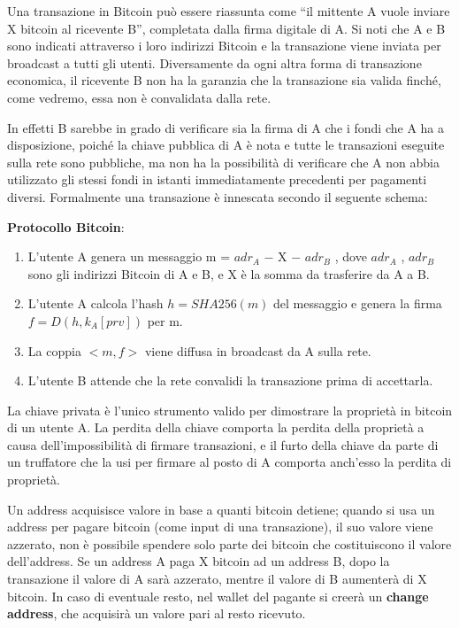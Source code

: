 Una transazione in Bitcoin può essere riassunta come “il mittente A vuole inviare X bitcoin al ricevente B”, completata dalla ﬁrma digitale di A. Si noti che A e B sono indicati attraverso i loro indirizzi Bitcoin e la transazione viene inviata per broadcast a tutti gli utenti. Diversamente da ogni altra forma di transazione economica, il ricevente B non ha la garanzia che la transazione sia valida ﬁnché, come vedremo, essa non è convalidata dalla rete. 

In effetti B sarebbe in grado di veriﬁcare sia la ﬁrma di A che i fondi che A ha a disposizione, poiché la chiave pubblica di A è nota e tutte le transazioni eseguite sulla rete sono pubbliche, ma non ha la possibilità di veriﬁcare che A non abbia utilizzato gli stessi fondi in istanti immediatamente precedenti per pagamenti diversi. Formalmente una transazione è innescata secondo il seguente schema:
\begin{center}
\textbf{Protocollo Bitcoin}:
\begin{enumerate}
    \item L’utente A genera un messaggio m = $adr_A$ $-$ X $-$ $adr_B$ , dove $adr_A$ , $adr_B$ sono gli indirizzi Bitcoin di A e B, e X è la somma da trasferire da A a B.
    \item L’utente A calcola l’hash $h = SHA256(m)$ del messaggio e genera la ﬁrma $f = D(h, k_A [prv])$ per m.
    \item La coppia $<m, f>$ viene diffusa in broadcast da A sulla rete.
    \item L’utente B attende che la rete convalidi la transazione prima di accettarla.
\end{enumerate}
\end{center}

La chiave privata è l’unico strumento valido per dimostrare la proprietà in bitcoin di un utente A.
La perdita della chiave comporta la perdita della proprietà a causa dell’impossibilità di ﬁrmare transazioni, e il furto della chiave da parte di un truﬀatore che la usi per ﬁrmare al posto di A comporta anch’esso la perdita di proprietà.

Un address acquisisce valore in base a quanti bitcoin detiene; quando si usa un address per pagare bitcoin (come input di una transazione), il suo valore viene azzerato, non è possibile spendere solo parte dei bitcoin che costituiscono il valore dell’address. Se un address A paga X bitcoin ad un address B, dopo la transazione il valore di A sarà azzerato, mentre il valore di B aumenterà di X bitcoin. In caso di eventuale resto, nel wallet del pagante si creerà un \textbf{change address}, che acquisirà un valore pari al resto ricevuto.

